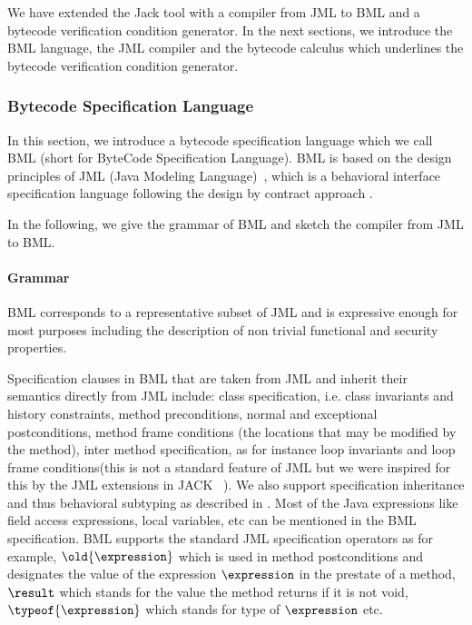 We have extended the Jack tool with a compiler from
 JML to BML and a bytecode verification condition generator. In the next sections, we introduce
 the BML language, the JML compiler and the bytecode \wpi calculus which underlines the bytecode verification condition generator.
 

\subsubsection{Bytecode Specification Language}\label{bcSpecLg}

In this section, we introduce a bytecode specification language which we call BML (short for ByteCode Specification Language).
 BML is based on the design principles of JML (Java Modeling Language)~\cite{JMLRefMan}, which is a behavioral interface specification 
language following the design by contract approach \cite{M97oos}.

In the following, we give the grammar of BML and sketch the compiler from JML to BML. 

\paragraph{Grammar} \label{grammar}


BML corresponds to a representative subset of JML and is expressive enough for most purposes including the description of non trivial functional and security properties.


 Specification clauses in BML that are taken from JML and inherit their semantics directly from JML include:
class specification, i.e. class invariants and history constraints, 
  method preconditions, normal and exceptional postconditions, method frame conditions (the locations that may be modified by the method), inter method specification, as for instance loop invariants and loop frame conditions(this is not a standard feature of JML but we were inspired for this by the JML extensions in JACK ~\cite{BRL-JACK}). 
We also support specification inheritance and thus behavioral subtyping as described in \cite{Dhara-Leavens96}. Most of the Java expressions like field access expressions, local variables, etc can be mentioned in the BML specification.
BML supports the standard JML specification operators as for example, $\old{\expression}$ which is used in method postconditions and
 designates the value of the expression $\expression$ in the prestate of a method, $ \result$ which stands for the value the method
returns if it is not void,  $\typeof{\expression}$ which stands for type of $\expression$ etc.  

